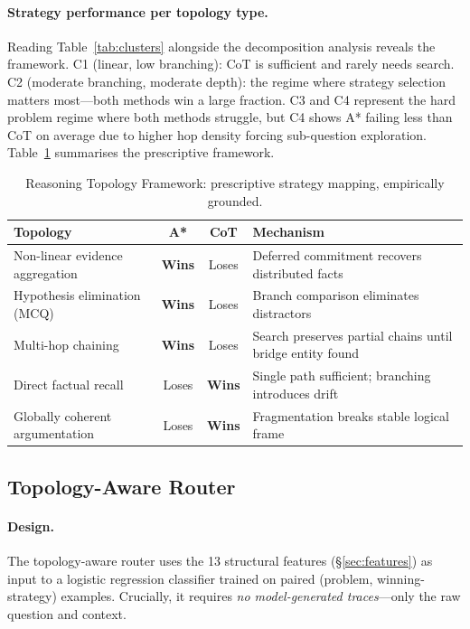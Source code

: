 \documentclass[11pt]{article}
\begin{document}
\paragraph{Strategy performance per topology type.}
Reading Table~\ref{tab:clusters} alongside the decomposition analysis reveals the framework. C1 (linear, low branching): CoT is sufficient and rarely needs search. C2 (moderate branching, moderate depth): the regime where strategy selection matters most—both methods win a large fraction. C3 and C4 represent the hard problem regime where both methods struggle, but C4 shows A* failing less than CoT on average due to higher hop density forcing sub-question exploration. Table~\ref{tab:topology_framework} summarises the prescriptive framework.

\begin{table}[t]
\centering
\caption{Reasoning Topology Framework: prescriptive strategy mapping, empirically grounded.}
\label{tab:topology_framework}
\small
\begin{tabular}{p{2.8cm}ccp{3.8cm}}
\toprule
\textbf{Topology} & \textbf{A*} & \textbf{CoT} & \textbf{Mechanism} \\
\midrule
Non-linear evidence aggregation & \textcolor{winred}{\textbf{Wins}} & Loses & Deferred commitment recovers distributed facts \\
Hypothesis elimination (MCQ) & \textcolor{winred}{\textbf{Wins}} & Loses & Branch comparison eliminates distractors \\
Multi-hop chaining & \textcolor{winred}{\textbf{Wins}} & Loses & Search preserves partial chains until bridge entity found \\
Direct factual recall & Loses & \textcolor{wingold}{\textbf{Wins}} & Single path sufficient; branching introduces drift \\
Globally coherent argumentation & Loses & \textcolor{wingold}{\textbf{Wins}} & Fragmentation breaks stable logical frame \\
\bottomrule
\end{tabular}
\end{table}

\subsection{Topology-Aware Router}
\label{sec:topo_router}

\paragraph{Design.}
The topology-aware router uses the 13 structural features (\S\ref{sec:features}) as input to a logistic regression classifier trained on paired (problem, winning-strategy) examples. Crucially, it requires \emph{no model-generated traces}—only the raw question and context.
\end{document}
